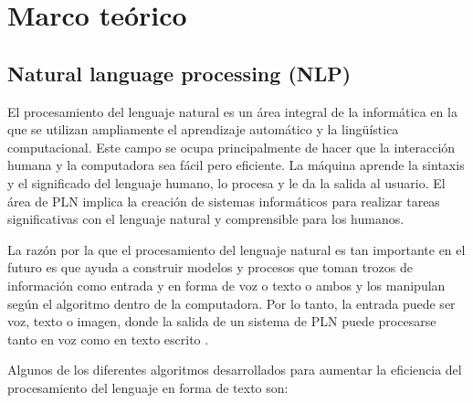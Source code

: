 \documentclass[../Main.tex]{subfiles}
\begin{document}
\section{Marco teórico}
\subsection{Natural language processing (NLP)}
\begin{justify}
El procesamiento del lenguaje natural es un área integral de la informática en la que se utilizan ampliamente el aprendizaje automático y la lingüística computacional. Este campo se ocupa principalmente de hacer que la interacción humana y la computadora sea fácil pero eficiente. La máquina aprende la sintaxis y el significado del lenguaje humano, lo procesa y le da la salida al usuario. El área de PLN implica la creación de sistemas informáticos para realizar tareas significativas con el lenguaje natural y comprensible para los humanos. 
\end{justify}\par
\begin{justify}
La razón por la que el procesamiento del lenguaje natural es tan importante en el futuro es que ayuda a construir modelos y procesos que toman trozos de información como entrada y en forma de voz o texto o ambos y los manipulan según el algoritmo dentro de la computadora. Por lo tanto, la entrada puede ser voz, texto o imagen, donde la salida de un sistema de PLN puede procesarse tanto en voz como en texto escrito \cite{15} .
\end{justify}\par
\begin{justify}
Algunos de los diferentes algoritmos desarrollados para aumentar la eficiencia del procesamiento del lenguaje en forma de texto son:
\end{justify}\par
\end{document}
